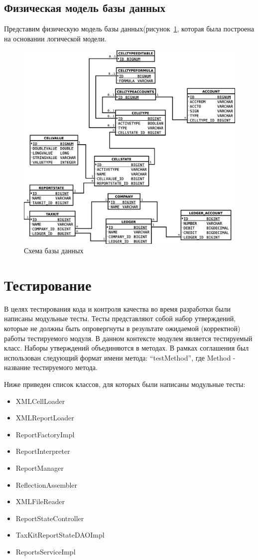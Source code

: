 \documentclass[14pt,a4paper]{reportmod}
\begin{document}
\subsection{Физическая модель базы данных}
Представим физическую модель базы данных(рисунок~\ref{pic:database}, которая была построена на основании логической модели.
\begin{figure}
  \centering
  \includegraphics[scale=0.4]{uml/database}
  \caption{Схема базы данных}
  \label{pic:database}
\end{figure}

\section{Тестирование}
В целях тестирования кода и контроля качества во время разработки были написаны модульные тесты. Тесты представляют собой набор утверждений, которые не должны быть опровергнуты в результате ожидаемой (корректной) работы тестируемого модуля. В данном контексте модулем является тестируемый класс. Наборы утверждений объединяются в методах. В рамках соглашения был использован следующий формат имени метода: ``testMethod'', где Method - название тестируемого метода.


Ниже приведен список классов, для которых были написаны модульные тесты:
\begin{itemize}
  \item XMLCellLoader
  \item XMLReportLoader
  \item ReportFactoryImpl
  \item ReportInterpreter
  \item ReportManager
  \item ReflectionAssembler
  \item XMLFileReader
  \item ReportStateController
  \item TaxKitReportStateDAOImpl
  \item ReportsServiceImpl
\end{itemize}
\end{document}
